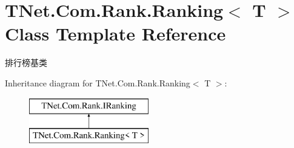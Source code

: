 \hypertarget{class_t_net_1_1_com_1_1_rank_1_1_ranking}{}\section{T\+Net.\+Com.\+Rank.\+Ranking$<$ T $>$ Class Template Reference}
\label{class_t_net_1_1_com_1_1_rank_1_1_ranking}


排行榜基类  


Inheritance diagram for T\+Net.\+Com.\+Rank.\+Ranking$<$ T $>$\+:\begin{figure}[H]
\begin{center}
\leavevmode
\includegraphics[height=2.000000cm]{class_t_net_1_1_com_1_1_rank_1_1_ranking}
\end{center}
\end{figure}
